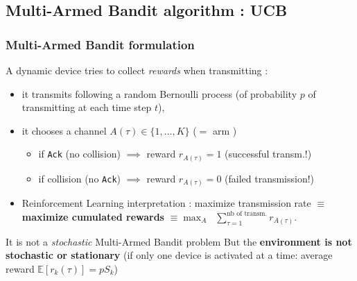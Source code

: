 \subsection{Multi-Armed Bandit algorithm : UCB}

\subsubsection{Multi-Armed Bandit formulation}

\begin{frameO}

    A dynamic device tries to collect \emph{rewards} when transmitting :

    \begin{itemize}
        \item
            it transmits following a random Bernoulli process \newline
            (of probability \(p\) of transmitting at each time step \(t\)),
        \item
            it chooses a channel \(A(\tau) \in \{1,\dots,K\}\)
            \hfill{} ($=$ arm \slotmachine)
        \begin{itemize}
        \item
            if \texttt{Ack} (no collision) \hspace*{2pt} \(\implies\) reward
            \(r_{A(\tau)} = 1\) \hfill{} (successful transm.!)
        \item
            if collision (no \texttt{Ack}) \hspace*{2pt} \(\implies\) reward
            \(r_{A(\tau)} = 0\) \hfill{} (failed transmission!)
        \end{itemize}

    \pause

    \item {Reinforcement Learning interpretation} :
        maximize transmission rate \(\equiv\) \textbf{maximize cumulated rewards}
        \(\equiv \max_{A} \;\; \sum\limits_{\tau=1}^{\text{nb of transm.}} r_{A(\tau)}\).

    \end{itemize}

    \begin{lightblock}{It is not a \emph{stochastic} Multi-Armed Bandit problem}
        But the \textbf{environment is not stochastic or stationary}\newline
        {\small (if only one device is activated at a time: average reward \(\mathbb{E}[r_k(\tau)] = p S_k\))}
    \end{lightblock}

\end{frameO}

